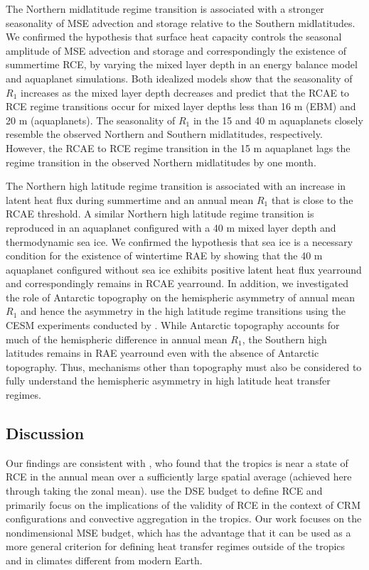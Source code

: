 \documentclass{ametsocV5}
\begin{document}
The Northern midlatitude regime transition is associated with a stronger seasonality of MSE advection and storage relative to the Southern midlatitudes. We confirmed the hypothesis that surface heat capacity controls the seasonal amplitude of MSE advection and storage and correspondingly the existence of summertime RCE, by varying the mixed layer depth in an energy balance model and aquaplanet simulations. Both idealized models show that the seasonality of $R_1$ increases as the mixed layer depth decreases and predict that the RCAE to RCE regime transitions occur for mixed layer depths less than 16 m (EBM) and 20 m (aquaplanets). The seasonality of $R_1$ in the 15 and 40 m aquaplanets closely resemble the observed Northern and Southern midlatitudes, respectively. However, the RCAE to RCE regime transition in the 15 m aquaplanet lags the regime transition in the observed Northern midlatitudes by one month.

The Northern high latitude regime transition is associated with an increase in latent heat flux during summertime and an annual mean $R_1$ that is close to the RCAE threshold. A similar Northern high latitude regime transition is reproduced in an aquaplanet configured with a 40 m mixed layer depth and thermodynamic sea ice. We confirmed the hypothesis that sea ice is a necessary condition for the existence of wintertime RAE by showing that the 40 m aquaplanet configured without sea ice exhibits positive latent heat flux yearround and correspondingly remains in RCAE yearround. In addition, we investigated the role of Antarctic topography on the hemispheric asymmetry of annual mean $R_1$ and hence the asymmetry in the high latitude regime transitions using the CESM experiments conducted by \cite{hahn2020}. While Antarctic topography accounts for much of the hemispheric difference in annual mean $R_1$, the Southern high latitudes remains in RAE yearround even with the absence of Antarctic topography. Thus, mechanisms other than topography must also be considered to fully understand the hemispheric asymmetry in high latitude heat transfer regimes.

\subsection{Discussion}
Our findings are consistent with \cite{jakob2019}, who found that the tropics is near a state of RCE in the annual mean over a sufficiently large spatial average (achieved here through taking the zonal mean). \cite{jakob2019} use the DSE budget to define RCE and primarily focus on the implications of the validity of RCE in the context of CRM configurations and convective aggregation in the tropics. Our work focuses on the nondimensional MSE budget, which has the advantage that it can be used as a more general criterion for defining heat transfer regimes outside of the tropics and in climates different from modern Earth.
\end{document}
